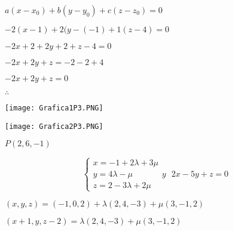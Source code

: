\documentclass{article}
\def\lthtmlcheckvsize{\ifdim\ht\sizebox<\vsize 
  \ifdim\wd\sizebox<\hsize\expandafter\hfill\fi \expandafter\vfill
  \else\expandafter\vss\fi}%
\begin{document}
{\newpage\clearpage
{}%
$ a(x-x_{0})+b(y-y_{0})+c(z-z_{0})=0$%
\lthtmlindisplaymathZ
\lthtmlcheckvsize\clearpage}

{\newpage\clearpage
{}%
$ -2(x-1)+2(y-(-1)+1(z-4)=0$%
\lthtmlindisplaymathZ
\lthtmlcheckvsize\clearpage}

{\newpage\clearpage
{}%
$ -2x+2+2y+2+z-4=0$%
\lthtmlindisplaymathZ
\lthtmlcheckvsize\clearpage}

{\newpage\clearpage
{}%
$ -2x+2y+z=-2-2+4$%
\lthtmlindisplaymathZ
\lthtmlcheckvsize\clearpage}

{\newpage\clearpage
{}%
$ -2x+2y+z=0$%
\lthtmlindisplaymathZ
\lthtmlcheckvsize\clearpage}

{\newpage\clearpage
{}%

$ \therefore$%
\lthtmlindisplaymathZ
\lthtmlcheckvsize\clearpage}

{\newpage\clearpage
{}%
\texttt{[image: Grafica1P3.PNG]}%
\lthtmlpictureZ
\lthtmlcheckvsize\clearpage}

{\newpage\clearpage
{}%
\texttt{[image: Grafica2P3.PNG]}%
\lthtmlpictureZ
\lthtmlcheckvsize\clearpage}

{\newpage\clearpage
{}%
$ P(2,6,-1)$%
\lthtmlindisplaymathZ
\lthtmlcheckvsize\clearpage}

{\newpage\clearpage
{}%
\begin{displaymath}\begin{cases} 
   x=-1+2\lambda+3\mu\\
   y=4\lambda-\mu\\
   z=2-3\lambda+2\mu
  \end{cases} y\  \ \  2x-5y+z=0\end{displaymath}%
\lthtmldisplayZ
\lthtmlcheckvsize\clearpage}

{\newpage\clearpage
{}%
$ (x, y, z)=(-1,0,2)+\lambda(2,4,-3)+\mu(3,-1,2)$%
\lthtmlindisplaymathZ
\lthtmlcheckvsize\clearpage}

{\newpage\clearpage
{}%
$ (x+1,y,z-2)=\lambda(2,4,-3)+\mu(3,-1,2)$%
\lthtmlindisplaymathZ
\lthtmlcheckvsize\clearpage}
\end{document}
